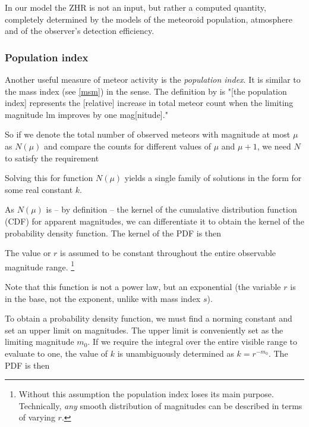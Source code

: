             In our model the ZHR is not an input, but rather a computed quantity, completely determined by the
            models of the meteoroid population, atmosphere and of the observer's detection efficiency.

        \subsubsection{Population index} \label{mspr}
            Another useful measure of meteor activity is the \emph{population index}.
            It is similar to the mass index (see \cref{msm}) in the sense.
            The definition by \citet{molau2015} is "[the population index] represents the [relative] increase
            in total meteor count when the limiting magnitude $\mathrm{lm}$ improves by one mag[nitude]."

            So if we denote the total number of observed meteors with magnitude at most $\mu$ as $N(\mu)$
            and compare the counts for different values of $\mu$ and $\mu + 1$, we need $N$ to satisfy the requirement

            Solving this for function $N(\mu)$ yields a single family of solutions
            in the form
            for some real constant $k$.

            As $N(\mu)$ is -- by definition -- the kernel of the
            cumulative distribution function (CDF) for apparent magnitudes, we can differentiate it
            to obtain the kernel of the probability density function. The kernel of the PDF is then

            The value or $r$ is assumed to be constant throughout the entire observable magnitude range.%
            \footnote{Without this assumption the population index loses its main purpose.
            Technically, \emph{any} smooth distribution of magnitudes can be described in terms of varying $r$.}

            Note that this function is not a power law, but an exponential (the variable $r$
            is in the base, not the exponent, unlike with mass index $s$).

            To obtain a probability density function, we must find a norming constant
            and set an upper limit on magnitudes. The upper limit is conveniently set as the limiting
            magnitude $m_0$. If we require the integral over the entire visible range to evaluate to one,
            the value of $k$ is unambiguously determined as $k = r^{-m_0}$.
            The PDF is then

